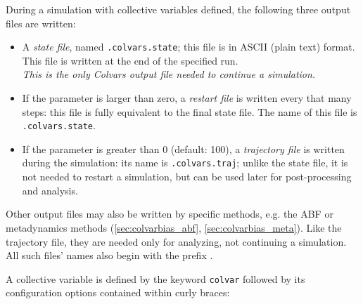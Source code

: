
During a simulation with collective variables defined, the following three output files are written:

\begin{itemize}

\item A \emph{state file}, named \outputName\texttt{.colvars.state}; this file is in ASCII (plain text) format.  This file is written at the end of the specified run.\\
  \emph{This is the only Colvars output file needed to continue a simulation.}

\item If the parameter  is larger than zero, a \emph{restart file} is written every that many steps: this file is fully equivalent to the final state file.
  The name of this file is \restartName\texttt{.colvars.state}.

\item If the parameter  is greater than 0 (default: 100), a \emph{trajectory file} is written during the simulation: its name is \outputName\texttt{.colvars.traj}; unlike the state file, it is not needed to restart a simulation, but can be used later for post-processing and analysis.

\end{itemize}

Other output files may also be written by specific methods, e.g.{} the ABF or metadynamics methods (\ref{sec:colvarbias_abf}, \ref{sec:colvarbias_meta}).
Like the trajectory file, they are needed only for analyzing, not continuing a simulation.
All such files' names also begin with the prefix \outputName.




A collective variable is defined by the keyword \texttt{colvar} followed by its configuration options contained within curly braces:

